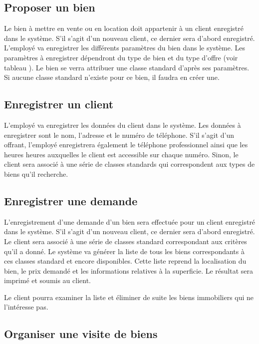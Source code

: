 \subsection{Proposer un bien}

Le bien à mettre en vente ou en location doit appartenir à un client enregistré dans le système. S'il s'agit d'un nouveau client, ce dernier sera d'abord enregistré. L'employé va enregistrer les différents paramètres du bien dans le système. Les paramètres à enregistrer dépendront du type de bien et du type d'offre (voir tableau ). Le bien se verra attribuer une classe standard d'après ses paramètres. Si aucune classe standard n'existe pour ce bien, il faudra en créer une.

\subsection{Enregistrer un client}

L'employé va enregistrer les données du client dans le système. Les données à enregistrer sont le nom, l'adresse et le numéro de téléphone. S'il s'agit d'un offrant, l'employé enregistrera également le téléphone professionnel ainsi que les heures heures auxquelles le client est accessible sur chaque numéro. Sinon, le client sera associé à une série de classes standards qui correspondent aux types de biens qu'il recherche.

\subsection{Enregistrer une demande}

L'enregistrement d'une demande d'un bien sera effectuée pour un client enregistré dans le système. S'il s'agit d'un nouveau client, ce dernier sera d'abord enregistré. Le client sera associé à une série de classes standard correspondant aux critères qu'il a donné. Le système va générer la liste de tous les biens correspondants à ces classes standard et encore disponibles. Cette liste reprend la localisation du bien, le prix demandé et les informations relatives à la superficie. Le résultat sera imprimé et soumis au client.

Le client pourra examiner la liste et éliminer de suite les biens immobiliers qui ne l'intéresse pas.

\subsection{Organiser une visite de biens}
\label{section_UC_organiser_une_visite_de_biens}

